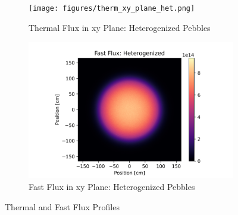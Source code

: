 \begin{figure}[H]
\centering

\begin{subfigure}{0.95\textwidth}
  \texttt{[image: figures/therm\_xy\_plane\_het.png]}
  \caption{Thermal Flux in xy Plane: Heterogenized Pebbles}
  \label{fig:het-plane-therm}
\end{subfigure}%

\begin{subfigure}{0.95\textwidth}
  \includegraphics[width=0.95\linewidth]{figures/fast_xy_plane_het.png}
  \caption{Fast Flux in xy Plane: Heterogenized Pebbles}
  \label{fig:het-plane-fast}
\end{subfigure}

%
\caption{Thermal and Fast Flux Profiles}
\label{fig:het-det-plane}
\end{figure}